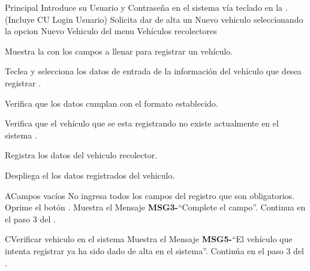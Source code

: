 \begin{UCtrayectoria}{Principal}
	\UCpaso[\UCactor] Introduce su Usuario  y Contraseña en el sistema vía teclado en la  .(Incluye CU Login Usuario)
	\UCpaso[\UCactor] Solicita dar de alta un Nuevo vehiculo seleccionando la opcion Nuevo Vehiculo  del menu Vehículos recolectores 
	
	\UCpaso Muestra la  con los campos  a llenar para registrar un vehículo.
	
	\UCpaso[\UCactor] Teclea y selecciona los datos de entrada de la información del vehículo que desea registrar  \label{CU17SeleccionarSeminario}.
	
	\UCpaso Verifica que  los datos cumplan con el formato establecido.
	
	
	\UCpaso Verifica que el vehículo que se esta registrando no existe actualmente en el sistema  .
	
	\UCpaso Registra los datos del vehiculo recolector.
	
	\UCpaso Despliega el los datos registrados del vehiculo.
	
	
\end{UCtrayectoria}
	


	\begin{UCtrayectoriaA}{A}{Campos vacíos}
	\UCpaso [\UCactor] No ingresa  todos los campos del registro que son obligatorios.
	\UCpaso[\UCactor] Oprime el botón .
	\UCpaso Muestra el Mensaje {\bf MSG3-}``Complete el campo''.
	\UCpaso Continua en el paso 3 del .
\end{UCtrayectoriaA}

\begin{UCtrayectoriaA}{C}{Verificar vehiculo en el sistema}
	\UCpaso Muestra el Mensaje {\bf MSG5-}``El vehículo que intenta registrar ya ha sido dado de alta en el sistema''.
	\UCpaso Continúa en el paso 3 del .
\end{UCtrayectoriaA}
		
